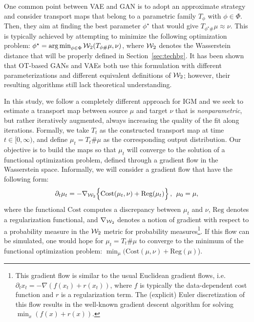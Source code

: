One common point between VAE and GAN is to adopt an approximate strategy and consider transport maps that belong to a parametric family $T_{\phi}$ with $\phi \in \Phi$. Then, they aim at finding the best parameter $\phi^\star$ that would give $T_{\phi^\star \#}\mu \approx \nu$. This is typically achieved by attempting to minimize the following optimization problem:
$\phi^\star = \operatorname*{arg\min}_{\phi \in \Phi} {\cal W}_2(T_{\phi \#}\mu, \nu)$,
where ${\cal W}_2$ denotes the Wasserstein distance that will be properly defined in Section~\ref{sec:techbg}. It has been shown that \cite{genevay2017gan} OT-based GANs \cite{arjovsky2017wasserstein} and VAEs \cite{tolstikhin2017wasserstein} both use this formulation with different parameterizations and different equivalent definitions of ${\cal W}_2$; however, their resulting algorithms still lack theoretical understanding.

In this study, we follow a completely different approach for IGM and we seek to estimate a transport map between source $\mu$ and target $\nu$ that is \textit{nonparametric}, but rather iteratively augmented, always increasing the quality of the fit along iterations. Formally, we take $T_t$ as the constructed transport map at time $t \in [0,\infty)$, and define $\mu_t=T_t \# \mu$ as the corresponding output distribution. Our objective is to build the maps so that $\mu_t$ will converge to the solution of a functional optimization problem, defined through a gradient flow in the Wasserstein space. Informally, we will consider a gradient flow that have the following form:
\begin{align}
\partial_t \mu_t = - \nabla_{{\cal W}_2} \Bigl\{ \mathrm{Cost}(\mu_t, \nu) + \mathrm{Reg}(\mu_t)\Bigr\} \, , \>\> \mu_0 = \mu,\label{eqn:gradflow}
\end{align}
where the functional $\mathrm{Cost}$ computes a discrepancy between $\mu_t$ and $\nu$, $\mathrm{Reg}$ denotes a regularization functional, and $\nabla_{{\cal W}_2}$ denotes a notion of gradient with respect to a probability measure in the ${\cal W}_2$ metric for probability measures\footnote{This gradient flow is similar to the usual Euclidean gradient flows, i.e.\ $\partial_t x_t = - \nabla (f(x_t) + r(x_t))$, where $f$ is typically the data-dependent cost function and $r$ is a regularization term. The (explicit) Euler discretization of this flow results in the well-known gradient descent algorithm for solving $\min_x (f(x)+r(x))$.}. If this flow can be simulated, one would hope for $\mu_t=T_t\#\mu$ to converge to the minimum of the functional optimization problem: $\min_\mu ( \mathrm{Cost}(\mu, \nu) + \mathrm{Reg}(\mu)$).


